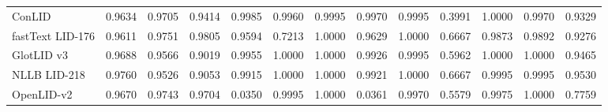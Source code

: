 \documentclass[11pt]{article}
\begin{document}
\begin{table}[p]
\begin{tabular}{l ccc cccccccc c}
ConLID & 0.9634 & 0.9705 & 0.9414 & 0.9985 & 0.9960 & 0.9995 & 0.9970 & 0.9995 & 0.3991 & 1.0000 & 0.9970 & 0.9329 \\
fastText LID-176 & 0.9611 & 0.9751 & 0.9805 & 0.9594 & 0.7213 & 1.0000 & 0.9629 & 1.0000 & 0.6667 & 0.9873 & 0.9892 & 0.9276 \\
GlotLID v3 & 0.9688 & 0.9566 & 0.9019 & 0.9955 & 1.0000 & 1.0000 & 0.9926 & 0.9995 & 0.5962 & 1.0000 & 1.0000 & 0.9465 \\
NLLB LID-218 & 0.9760 & 0.9526 & 0.9053 & 0.9915 & 1.0000 & 1.0000 & 0.9921 & 1.0000 & 0.6667 & 0.9995 & 0.9995 & 0.9530 \\
OpenLID-v2 & 0.9670 & 0.9743 & 0.9704 & 0.0350 & 0.9995 & 1.0000 & 0.0361 & 0.9970 & 0.5579 & 0.9975 & 1.0000 & 0.7759 \\
\bottomrule
\end{tabular}

\vspace{12pt}


\end{table}
\end{document}
